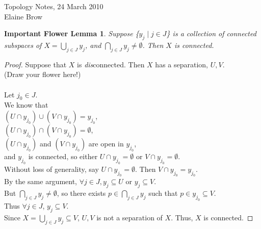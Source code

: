 \documentclass[10pt,reqno]{amsart}
\newtheorem*{Important Flower Lemma}{Important Flower Lemma}
\newtheorem*{Teeny Facts About Connected Components}{Teeny Facts About Connected Components}
\begin{document}
\begin{center}
\huge Topology Notes, 24 March 2010 \\
\normalsize
Elaine Brow
\end{center}
\vspace{.1in}

\begin{Important Flower Lemma}
Suppose \{$y_j \mid j \in J$\} is a collection of connected subspaces of $X = \displaystyle{\bigcup_{j \in J} y_j}$,  and $\displaystyle{\bigcap_{j \in J} y_j} \neq \emptyset$. Then $X$ is connected. \\
\end{Important Flower Lemma}

\begin{proof}
Suppose that $X$ is {\it dis}connected. Then $X$ has a separation, $U, V$. \\
(Draw your flower here!)\\
\vspace{2.2in}\\
Let $j_0 \in J$.\\
We know that\\
\indent $(U\cap y_{j_0}) \cup (V\cap y_{j_0}) = y_{j_0}$, \\
\indent $(U\cap y_{j_0}) \cap (V\cap y_{j_0}) = \emptyset$, \\
\indent $(U\cap y_{j_0})$ and $(V\cap y_{j_0})$ are open in $y_{j_0}$, \\
\indent and $y_{j_0}$ is connected, so either $U \cap y_{j_0} = \emptyset$ or $V \cap y_{j_0} = \emptyset$.\\
Without loss of generality, say $U \cap y_{j_0} = \emptyset$. Then $V \cap y_{j_0} = y_{j_0}$.\\
By the same argument, $\forall j\in J, y_j \subseteq U$ or $y_j \subseteq V$.\\
But $\displaystyle{\bigcap_{j \in J} y_j} \neq \emptyset$,  so there exists $p\in \displaystyle{\bigcap_{j \in J} y_j}$ such that $p\in y_{j_0} \subseteq V$.\\
Thus $\forall j\in J$, $y_j \subseteq V$.\\
Since $X = \displaystyle{\bigcup_{j \in J} y_j} \subseteq V$, $U, V$ is not a separation of $X$.
Thus, $X$ is connected.\end{proof}
\end{document}

